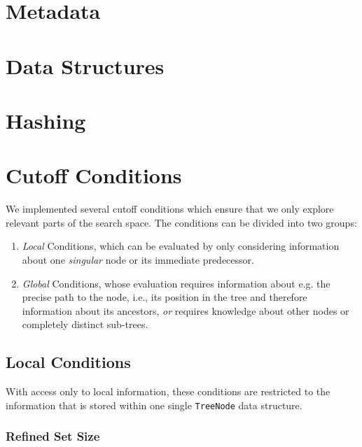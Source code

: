 	\section{Metadata}
	\label{chap:impl:meta}
	
	\section{Data Structures}
	\label{chap:impl:structures}
	
		
	
	\section{Hashing}
	\label{chap:impl:hashing}
	
		\clearpage
	
	\section{Cutoff Conditions}
	\label{chap:impl:cutoff}
	
		We implemented several cutoff conditions which ensure that we only explore relevant parts of the search space.
		The conditions can be divided into two groups:
		
		\begin{enumerate}
			\item \textit{Local} Conditions, which can be evaluated by only considering information about one \textit{singular} node or its immediate predecessor.
			\item \textit{Global} Conditions, whose evaluation requires information about e.g. the precise path to the node, i.e., its position in the tree and therefore information about its ancestors, \textit{or} requires knowledge about other nodes or completely distinct sub-trees.
		\end{enumerate}
	
		\subsection{Local Conditions}
		
			With access only to local information, these conditions are restricted to the information that is stored within one single \lstinline|TreeNode| data structure.
			
			\subsubsection{Refined Set Size}
			
